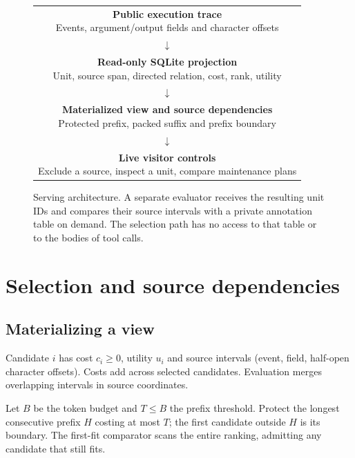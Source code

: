 \documentclass[conference]{IEEEtran}
\begin{document}
\begin{figure}[t]
\centering
\setlength{\fboxsep}{4pt}
\begin{tabular}{@{}c@{}}
\fcolorbox{forest}{white}{\parbox{.88\columnwidth}{\centering \textbf{Public execution trace}\\Events, argument/output fields and character offsets}}\\
$\downarrow$\\
\fcolorbox{forest}{white}{\parbox{.88\columnwidth}{\centering \textbf{Read-only SQLite projection}\\Unit, source span, directed relation, cost, rank, utility}}\\
$\downarrow$\\
\fcolorbox{forest}{white}{\parbox{.88\columnwidth}{\centering \textbf{Materialized view and source dependencies}\\Protected prefix, packed suffix and prefix boundary}}\\
$\downarrow$\\
\fcolorbox{forest}{white}{\parbox{.88\columnwidth}{\centering \textbf{Live visitor controls}\\Exclude a source, inspect a unit, compare maintenance plans}}\\
\end{tabular}
\caption{Serving architecture. A separate evaluator receives the resulting unit IDs and compares their source intervals with a private annotation table on demand. The selection path has no access to that table or to the bodies of tool calls.}
\label{fig:system}
\end{figure}

\section{Selection and source dependencies}

\subsection{Materializing a view}
Candidate $i$ has cost $c_i\geq0$, utility $u_i$ and source intervals (event, field, half-open character offsets). Costs add across selected candidates. Evaluation merges overlapping intervals in source coordinates.

Let $B$ be the token budget and $T\leq B$ the prefix threshold. Protect the longest consecutive prefix $H$ costing at most $T$; the first candidate outside $H$ is its boundary. The first-fit comparator scans the entire ranking, admitting any candidate that still fits.
\end{document}
